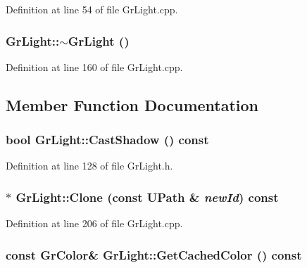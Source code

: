Definition at line 54 of file GrLight.cpp.\hypertarget{class_gr_light_dfbafb36986f1f862ee927ff2b46e566}{
\subsubsection[{$\sim$GrLight}]{\setlength{\rightskip}{0pt plus 5cm}GrLight::$\sim$GrLight ()}}
\label{class_gr_light_dfbafb36986f1f862ee927ff2b46e566}




Definition at line 160 of file GrLight.cpp.

\subsection{Member Function Documentation}
\hypertarget{class_gr_light_729edc3bf96dd2a6b98afd324b066c31}{
\subsubsection[{CastShadow}]{\setlength{\rightskip}{0pt plus 5cm}bool GrLight::CastShadow () const}}
\label{class_gr_light_729edc3bf96dd2a6b98afd324b066c31}




Definition at line 128 of file GrLight.h.\hypertarget{class_gr_light_6a46f8d5b6f38e19e5eaa01710b648c1}{
\subsubsection[{Clone}]{ $\ast$ GrLight::Clone (const {\bf UPath} \& {\em newId}) const}}
\label{class_gr_light_6a46f8d5b6f38e19e5eaa01710b648c1}




Definition at line 206 of file GrLight.cpp.\hypertarget{class_gr_light_043ab42704a0f7df5f68219efc99d1f9}{
\subsubsection[{GetCachedColor}]{\setlength{\rightskip}{0pt plus 5cm}const {\bf GrColor}\& GrLight::GetCachedColor () const}}
\label{class_gr_light_043ab42704a0f7df5f68219efc99d1f9}




